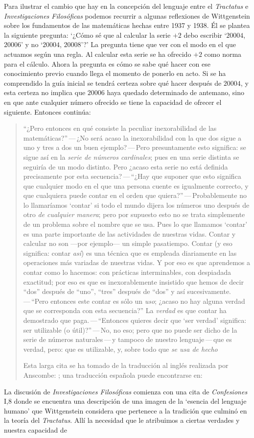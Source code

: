 Para ilustrar el cambio que hay en la concepción del lenguaje entre el \emph{Tractatus} e \emph{Investigaciones Filosóficas} podemos recurrir a algunas reflexiones de Wittgenstein sobre los fundamentos de las matemáticas hechas entre 1937 y 1938. Él se plantea la siguiente pregunta: \enquote*{¿Cómo sé que al calcular la serie $+2$ debo escribir `$20004$, $20006$' y no `$20004$, $20008$'?} La pregunta tiene que ver con el modo en el que actuamos según una regla. Al calcular esta serie se ha ofrecido $+2$ como norma para el cálculo. Ahora la pregunta es cómo se sabe qué hacer con ese conocimiento previo cuando llega el momento de ponerlo en acto. Si se ha comprendido la guía inicial se tendrá certeza sobre qué hacer después de $20004$, y esta certeza no implica que $20006$ haya quedado determinado de antemano, sino en que ante cualquier número ofrecido se tiene la capacidad de ofrecer el siguiente. Entonces continúa: \blockquote[Esta larga cita se ha tomado de la traducción al inglés realizada por Anscombe: {\cite[I, \S4]{wittgenstein1956remmath}}; una traducción española puede encontrarse en: {\cite[17-18]{wittgenstein1956remmathes}}]{``¿Pero entonces en qué consiste la peculiar inexorabilidad de las matemáticas?''\,---\,¿No será acaso la inexorabilidad con la que dos sigue a uno y tres a dos un buen ejemplo?\,---\,Pero presuntamente esto significa: se sigue así en la \emph{serie de números cardinales}; pues en una serie distinta se seguiría de un modo distinto. Pero ¿acaso esta serie no está definida precisamente por esta secuencia?\,---\,``¿Hay que suponer que esto significa que cualquier modo en el que una persona cuente es igualmente correcto, y que cualquiera puede contar en el orden que quiera?''\,---\,Probablemente no lo llamaríamos `contar' si todo el mundo dijera los números uno después de otro \emph{de cualquier manera}; pero por supuesto esto no se trata simplemente de un problema sobre el nombre que se usa. Pues lo que llamamos `contar' es una parte importante de las actividades de nuestras vidas. Contar y calcular no son ---por ejemplo--- un simple pasatiempo. Contar (y eso significa: contar \emph{así}) es una técnica que es empleada diariamente en las operaciones más variadas de nuestras vidas. Y por eso es que aprendemos a contar como lo hacemos: con prácticas interminables, con despiadada exactitud; por eso es que es inexorablemente insistido que hemos de decir ``dos'' después de ``uno'', ``tres'' después de ``dos'' y así sucesivamente.\,---\,``Pero entonces este contar es sólo un \emph{uso}; ¿acaso no hay alguna verdad que se corresponda con esta secuencia?'' La \emph{verdad} es que contar ha demostrado que paga.\,---\,``Entonces quieres decir que `ser verdad' significa: ser utilizable (o útil)?''\,---\,No, no eso; pero que no puede ser dicho de la serie de números naturales\,---\,y tampoco de nuestro lenguaje\,---\,que es verdad, pero: que es utilizable, y, sobre todo que \emph{se usa de hecho}}. La discusión de \emph{Investigaciones Filosóficas} comienza con una cita de \emph{Confesiones} I,8 donde se encuentra una descripción de una imagen de la `esencia del lenguaje humano' que Wittgenstein considera que pertenece a la tradición que culminó en la teoría del \emph{Tractatus}. Allí la necesidad que le atribuimos a ciertas verdades y nuestra capacidad de 